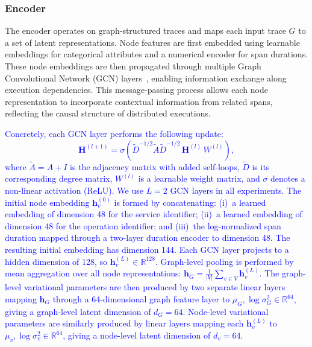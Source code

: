 \documentclass[sigconf,review]{acmart}
\begin{document}

\subsubsection{Encoder}

The encoder operates on graph-structured traces and maps each input trace $G$ to a set of latent representations. Node features are first embedded using learnable embeddings for categorical attributes and a numerical encoder for span durations. These node embeddings are then propagated through multiple Graph Convolutional Network (GCN) layers~\cite{kipf2016semi}, enabling information exchange along execution dependencies. This message-passing process allows each node representation to incorporate contextual information from related spans, reflecting the causal structure of distributed executions.


\textcolor{blue}{Concretely, each GCN layer performs the following update:
\[
\mathbf{H}^{(l+1)} = \sigma\!\left(\tilde{D}^{-1/2}\tilde{A}\tilde{D}^{-1/2}\,\mathbf{H}^{(l)}\,W^{(l)}\right),
\]
where $\tilde{A} = A + I$ is the adjacency matrix with added self-loops, $\tilde{D}$ is its corresponding degree matrix, $W^{(l)}$ is a learnable weight matrix, and $\sigma$ denotes a non-linear activation (ReLU). We use $L = 2$ GCN layers in all experiments. The initial node embedding $\mathbf{h}_v^{(0)}$ is formed by concatenating: (i)~a learned embedding of dimension 48 for the service identifier; (ii)~a learned embedding of dimension 48 for the operation identifier; and (iii)~the log-normalized span duration mapped through a two-layer duration encoder to dimension 48. The resulting initial embedding has dimension 144. Each GCN layer projects to a hidden dimension of 128, so $\mathbf{h}_v^{(L)} \in \mathbb{R}^{128}$. Graph-level pooling is performed by mean aggregation over all node representations: $\mathbf{h}_G = \frac{1}{|V|}\sum_{v\in V}\mathbf{h}_v^{(L)}$. The graph-level variational parameters are then produced by two separate linear layers mapping $\mathbf{h}_G$ through a 64-dimensional graph feature layer to $\mu_G, \log\sigma_G^2 \in \mathbb{R}^{64}$, giving a graph-level latent dimension of $d_G = 64$. Node-level variational parameters are similarly produced by linear layers mapping each $\mathbf{h}_v^{(L)}$ to $\mu_v, \log\sigma_v^2 \in \mathbb{R}^{64}$, giving a node-level latent dimension of $d_v = 64$.}
\end{document}
